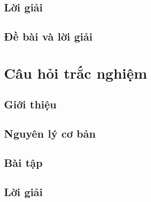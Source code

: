 \documentclass[11pt,openany]{book}
\theoremstyle{definition}
\theoremstyle{plain}
\begin{document}
\section{Lời giải}
\indapanloigiai
\begin{enumerate}[]
\foreachproblem[bttuluan]{\item\causo\thisproblem}
\end{enumerate}

\section{Đề bài và lời giải}
\indebailoigiai
\begin{enumerate}[]
\foreachproblem[bttuluan]{\item\causo\thisproblem}
\end{enumerate}

\chapter{Câu hỏi trắc nghiệm}
\minitoc %
\thispagestyle{empty}


\section{Giới thiệu}

\section{Nguyên lý cơ bản}

\section{Bài tập}

\indebai
\begin{enumerate}[]
\foreachproblem[bttracnghiem]{\item\causo\thisproblem}
\end{enumerate}

\section{Lời giải}

\indapanlietke
\begin{multicols}{5}
\begin{enumerate}[\causo]
\foreachproblem[bttracnghiem]{\item\thisproblem}
\end{enumerate}
\end{multicols}
\end{document}
